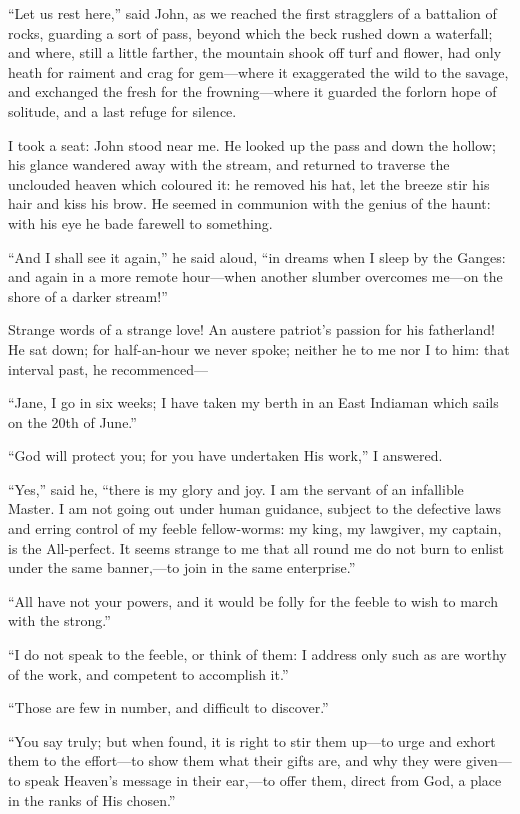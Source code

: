 \enquote{Let us rest here,} said \St{} John, as we reached the first
stragglers of a battalion of rocks, guarding a sort of pass, beyond
which the beck rushed down a waterfall; and where, still a little
farther, the mountain shook off turf and flower, had only heath for
raiment and crag for gem---where it exaggerated the wild to the savage,
and exchanged the fresh for the frowning---where it guarded the forlorn
hope of solitude, and a last refuge for silence.

I took a seat: \St{} John stood near me. He looked up the pass and down
the hollow; his glance wandered away with the stream, and returned to
traverse the unclouded heaven which coloured it: he removed his hat, let
the breeze stir his hair and kiss his brow. He seemed in communion with
the genius of the haunt: with his eye he bade farewell to something.

\enquote{And I shall see it again,} he said aloud, \enquote{in dreams
	when I sleep by the Ganges: and again in a more remote hour---when
	another slumber overcomes me---on the shore of a darker stream!}

Strange words of a strange love! An austere patriot's passion for his
fatherland! He sat down; for half-an-hour we never spoke; neither he to
me nor I to him: that interval past, he recommenced---

\enquote{Jane, I go in six weeks; I have taken my berth in an East
	Indiaman which sails on the 20th of June.}

\enquote{God will protect you; for you have undertaken His work,} I
answered.

\enquote{Yes,} said he, \enquote{there is my glory and joy. I am the
	servant of an infallible Master. I am not going out under human
	guidance, subject to the defective laws and erring control of my feeble
	fellow-worms: my king, my lawgiver, my captain, is the All-perfect. It
	seems strange to me that all round me do not burn to enlist under the
	same banner,---to join in the same enterprise.}

\enquote{All have not your powers, and it would be folly for the feeble
	to wish to march with the strong.}

\enquote{I do not speak to the feeble, or think of them: I address only
	such as are worthy of the work, and competent to accomplish it.}

\enquote{Those are few in number, and difficult to discover.}

\enquote{You say truly; but when found, it is right to stir them up---to
	urge and exhort them to the effort---to show them what their gifts are,
	and why they were given---to speak Heaven's message in their ear,---to
	offer them, direct from God, a place in the ranks of His chosen.}

